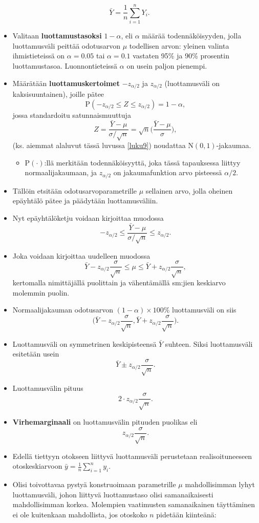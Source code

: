 \documentclass[
]{book}
\providecommand{\tightlist}{%
  \setlength{\itemsep}{0pt}\setlength{\parskip}{0pt}}
\begin{document}
\[
\bar{Y} = \frac{1}{n} \sum_{i=1}^{n} Y_i.
\]

\begin{itemize}
\item
  Valitaan \textbf{luottamustasoksi} \(1-\alpha\), eli \(\alpha\) määrää todennäköisyyden, jolla luottamusväli peittää odotusarvon \(\mu\) todellisen arvon: yleinen valinta ihmistieteissä on \(\alpha = 0.05\) tai \(\alpha = 0.1\) vastaten 95\% ja 90\% prosentin luottamustasoa. Luonnontieteissä \(\alpha\) on usein paljon pienempi.
\item
  Määrätään \textbf{luottamuskertoimet} \(-z_{\alpha/2}\) ja \(z_{\alpha/2}\) (luottamusväli on kaksisuuntainen), joille pätee
  \[
  \text{P}(-z_{\alpha/2} \le Z \le z_{\alpha/2}) = 1-\alpha,
  \]
  jossa standardoitu satunnaismuuttuja
  \[
  Z = \frac{\bar{Y} - \mu}{\sigma / \sqrt{n}} = \sqrt{n} \Big( \frac{\bar{Y} - \mu}{\sigma} \Big),  
  \]
  (ks. aiemmat alaluvut tässä luvussa \ref{luku9}) noudattaa \(\text{N}(0,1)\)-jakaumaa.

  \begin{itemize}
  \tightlist
  \item
    \(\text{P}(\cdot)\):llä merkitään todennäköisyyttä, joka tässä tapauksessa liittyy normaalijakaumaan, ja \(z_{\alpha/2}\) on jakaumafunktion arvo pisteessä \(\alpha/2\).
  \end{itemize}
\item
  Tällöin etsitään odotusarvoparametrille \(\mu\) sellainen arvo, jolla oheinen epäyhtälö pätee ja päädytään luottamusväliin.
\item
  Nyt epäyhtälöketju voidaan kirjoittaa muodossa
  \[
  -z_{\alpha/2} \le  \frac{\bar{Y} - \mu}{\sigma / \sqrt{n}}  \le z_{\alpha/2}.
  \]
\item
  Joka voidaan kirjoittaa uudelleen muodossa
  \[
  \bar{Y} - z_{\alpha/2} \frac{\sigma}{\sqrt{n}} \le   \mu  \le 
  \bar{Y} + z_{\alpha/2} \frac{\sigma}{\sqrt{n}},
  \]
  kertomalla nimittäjällä puolittain ja vähentämällä sm:jien keskiarvo molemmin puolin.
\item
  Normaalijakauman odotusarvon \((1-\alpha) \times 100\)\% luottamusväli on siis
  \[
  \Big(\bar{Y} - z_{\alpha/2} \frac{\sigma}{\sqrt{n}}, 
  \bar{Y} + z_{\alpha/2} \frac{\sigma}{\sqrt{n}} \Big).
  \]
\item
  Luottamusväli on symmetrinen keskipisteensä \(\bar{Y}\) suhteen. Siksi luottamusväli esitetään usein
  \[
  \bar{Y} \pm z_{\alpha/2} \frac{\sigma}{\sqrt{n}}.
  \]
\item
  Luottamusvälin pituus
  \[
  2 \cdot z_{\alpha/2} \frac{\sigma}{\sqrt{n}}.
  \]
\item
  \textbf{Virhemarginaali} on luottamusvälin pituuden puolikas eli
  \[
  z_{\alpha/2} \frac{\sigma}{\sqrt{n}}.
  \]
\item
  Edellä tiettyyn otokseen liittyvä luottamusväli perustetaan realisoituneeseen otoskeskiarvoon \(\bar{y}=\frac{1}{n} \sum_{i=1}^{n} y_i\).
\item
  Olisi toivottavaa pystyä konstruoimaan parametrille \(\mu\) mahdollisimman lyhyt luottamusväli, johon liittyvä luottamustaso olisi samanaikaisesti mahdollisimman korkea. Molempien vaatimusten samanaikainen täyttäminen ei ole kuitenkaan mahdollista, jos otoskoko \(n\) pidetään kiinteänä:


\end{itemize}
\end{document}
